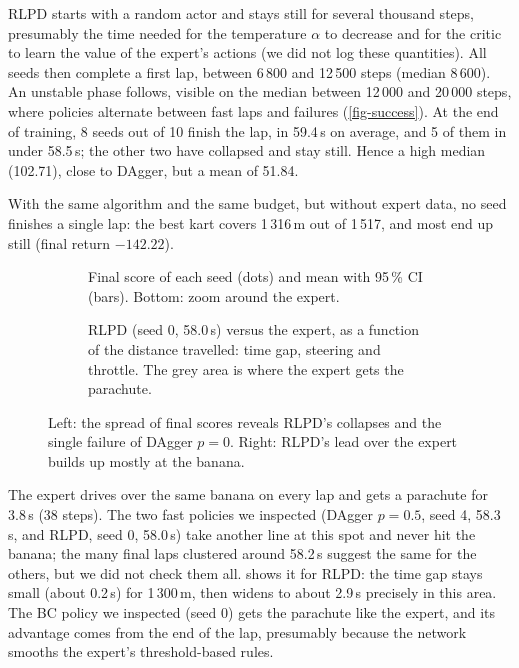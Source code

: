 \documentclass[10pt,a4paper,english]{article}
\begin{document}
RLPD starts with a random actor and stays still for several thousand steps, presumably the time needed for the temperature $\alpha$ to decrease and for the critic to learn the value of the expert's actions (we did not log these quantities). All seeds then complete a first lap, between 6\,800 and 12\,500 steps (median 8\,600). An unstable phase follows, visible on the median between 12\,000 and 20\,000 steps, where policies alternate between fast laps and failures (\cref{fig-success}). At the end of training, 8 seeds out of 10 finish the lap, in 59.4\,s on average, and 5 of them in under 58.5\,s; the other two have collapsed and stay still. Hence a high median (102.71), close to DAgger, but a mean of 51.84.

With the same algorithm and the same budget, but without expert data, no seed finishes a single lap: the best kart covers 1\,316\,m out of 1\,517, and most end up still (final return $-142.22$).

\begin{figure}[t]
  \centering
  \begin{subfigure}[t]{0.49\linewidth}\centering{}\caption{Final score of each seed (dots) and mean with 95\,\% CI (bars). Bottom: zoom around the expert.}\label{fig-final}\end{subfigure}\hfill
  \begin{subfigure}[t]{0.49\linewidth}\centering{}\caption{RLPD (seed 0, 58.0\,s) versus the expert, as a function of the distance travelled: time gap, steering and throttle. The grey area is where the expert gets the parachute.}\label{fig-gap}\end{subfigure}
  \caption{Left: the spread of final scores reveals RLPD's collapses and the single failure of DAgger $p=0$. Right: RLPD's lead over the expert builds up mostly at the banana.}
  \label{fig-final-gap}
\end{figure}

The expert drives over the same banana on every lap and gets a parachute for 3.8\,s (38 steps). The two fast policies we inspected (DAgger $p = 0.5$, seed 4, 58.3\,s, and RLPD, seed 0, 58.0\,s) take another line at this spot and never hit the banana; the many final laps clustered around 58.2\,s suggest the same for the others, but we did not check them all.  shows it for RLPD: the time gap stays small (about 0.2\,s) for 1\,300\,m, then widens to about 2.9\,s precisely in this area. The BC policy we inspected (seed 0) gets the parachute like the expert, and its advantage comes from the end of the lap, presumably because the network smooths the expert's threshold-based rules.
\end{document}
